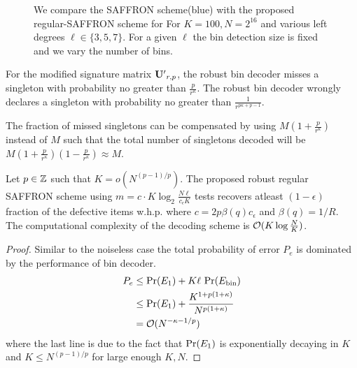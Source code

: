 \documentclass[conference,twocolumn]{IEEEtran}
\newcommand*{\FigPath}{../Figures}
\def\ceps{c_{\epsilon}}
\begin{document}

\begin{figure}
\centering
\resizebox{0.9\columnwidth}{2.4in}{}
\caption{We compare the SAFFRON scheme(blue) with the proposed regular-SAFFRON scheme for For $K=100, N=2^{16}$  and various left degrees $\ell\in\{3,5,7\}$. For a given $\ell$ the bin detection size is fixed and we vary the number of bins.}
\label{Fig:SimulationNoiseless}
\end{figure}

\begin{lemma}
For the modified signature matrix $\mathbf{U'}_{r,p}$, the robust bin decoder misses a singleton with probability no greater than $\frac{p}{r^{\kappa}}$. The robust bin decoder wrongly declares a singleton with probability no greater than $\frac{1}{r^{p\kappa +p-1}}$.
\end{lemma}
The fraction of missed singletons can be compensated by using $M(1+\frac{p}{r^{\kappa}})$ instead of $M$ such that the total number of singletons decoded will be $M(1+\frac{p}{r^{\kappa}})(1-\frac{p}{r^{\kappa}})\approx M$.

\begin{theorem}
Let $p\in\mathbb{Z}$ such that $K=o\left(N^{(p-1)/p}\right)$. The proposed robust regular SAFFRON scheme using $m=c\cdot K \log_{2}\frac{N\ell}{\ceps K}$ tests recovers atleast $(1-\epsilon)$ fraction of the defective items w.h.p. where $c=2p\beta(q)\ceps$ and $\beta(q)=1/R$. The computational complexity of the decoding scheme is $\mathcal{O}(K\log \frac{N}{K})$.
\end{theorem}
\begin{proof}
Similar to the noiseless case the total probability of error $P_e$ is dominated by the performance of bin decoder.
\begin{align*}
P_e &\leq  \text{Pr}(E_1)+ K\ell \text{ Pr}(E_{\text{bin}})\\
               &\leq \text{Pr}(E_1)+ \frac{K^{1+p(1+\kappa)}}{N^{p(1+\kappa)}}\\
               &=\mathcal{O}(N^{-\kappa-1/p})
\end{align*}
where the last line is due to the fact that $\text{Pr}(E_1)$ is exponentially decaying in $K$ and $K\leq N^{(p-1)/p}$ for large enough $K,N$.
\end{proof}
\end{document}
